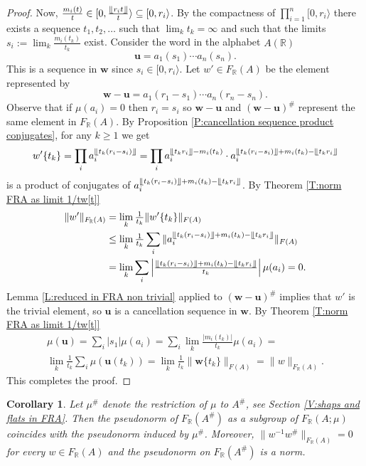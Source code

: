 \documentclass[12pt]{amsart}
\newtheorem{cor}[prop]{Corollary}
\theoremstyle{definition}
\def\RR{\ensuremath{\mathbb{R}}}
\newcommand{\B}[1]{\mathbf{#1}}
\newcommand{\trc}[1]{\{ #1 \}}   %
\def\Free{F}
\newcommand{\myfloor}[1]{\llfloor #1 \rrfloor}
\newcommand{\myinterval}[1]{[ #1 \rangle}
\begin{document}
\begin{proof}
Now, $\tfrac{m_i(t)}{t} \in \myinterval{0,\tfrac{\myfloor{r_it}}{t}} \subseteq \myinterval{0,r_i}$.
By the compactness of $\prod_{i=1}^n \myinterval{0,r_i}$ there exists a sequence $t_1,t_2,\dots$ such that $\lim_k t_k=\infty$ and such that the limits $s_i := \lim_k \tfrac{m_i(t_k)}{t_k}$ exist.
Consider the word in the alphabet $A(\RR)$
\[
\B u = a_1(s_1) \cdots a_n(s_n).
\]
This is a sequence in $\B w$ since $s_i \in \myinterval{0,r_i}$.
Let $w' \in \Free_\RR(A)$ be the element represented by 
\[
\B w- \B u = a_1(r_1-s_1)\cdots a_n(r_n-s_n).
\]
Observe that if $\mu(a_i)=0$ then $r_i=s_i$ so $\B w - \B u$ and $(\B w - \B u)^\#$ represent the same element in $\Free_\RR(A)$.
By Proposition \ref{P:cancellation sequence product conjugates}, for any $k\geq 1$ we get
\[
w'\trc{t_k}= \prod_i a_i^{\myfloor{t_k(r_i-s_i)}} =
\prod_i a_i^{\myfloor{t_kr_i}-m_i(t_k)} \cdot a_i^{\myfloor{t_k(r_i-s_i)}+m_i(t_k)-\myfloor{t_kr_i}}
\]
is a product of conjugates of $a_i^{\myfloor{t_k(r_i-s_i)}+m_i(t_k)-\myfloor{t_kr_i}}$.
By Theorem \ref{T:norm FRA as limit 1/tw[t]}
\begin{align*}
\|w'\|_{\Free_\RR(A)} &= 
\lim_k \tfrac{1}{t_k}\|w'\trc{t_k}\|_{\Free(A)}
\\
&\leq 
\lim_k \tfrac{1}{t_k} \sum_i \|a_i^{\myfloor{t_k(r_i-s_i)}+m_i(t_k)-\myfloor{t_kr_i}}\|_{\Free(A)} 
\\
&=
\lim_k \sum_i \left| \tfrac{\myfloor{t_k(r_i-s_i)}+m_i(t_k)-\myfloor{t_kr_i}}{t_k}\right| \mu(a_i) =0.
\end{align*}
Lemma \ref{L:reduced in FRA non trivial} applied to $(\B w - \B u)^\#$ implies that $w'$ is the trivial element, so $\B u$ is a cancellation sequence in $\B w$.
By Theorem \ref{T:norm FRA as limit 1/tw[t]}
\begin{multline*}
\mu(\B u) = \sum_i |s_1| \mu(a_i) =
\sum_i \lim_k \tfrac{|m_i(t_k)|}{t_k} \mu(a_i) =
\\
\lim_k \tfrac{1}{t_k} \sum_i \mu(\B u(t_k)) =
\lim_k \tfrac{1}{t_k} \|\B w\trc{t_k}\|_{\Free(A)} =
\|w\|_{\Free_\RR(A)}.
\end{multline*}
This completes the proof.
\end{proof}



\begin{cor}\label{C:FRAsharp sense in FRA}
Let $\mu^\#$ denote the restriction of $\mu$ to $A^\#$, see Section \ref{V:shaps and flats in FRA}.
Then the pseudonorm of $\Free_\RR(A^\#)$ as a subgroup of $\Free_\RR(A;\mu)$ coincides with the pseudonorm induced by $\mu^\#$.
Moreover, $\|w^{-1}w^\#\|_{\Free_\RR(A)}=0$ for every $w \in \Free_\RR(A)$ and the pseudonorm on $\Free_\RR(A^\#)$ is a norm.
\end{cor}
\end{document}
